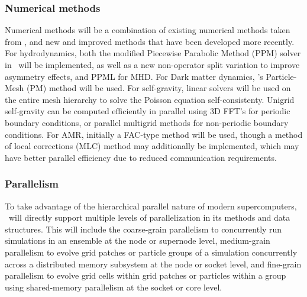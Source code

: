 \documentclass[11pt]{article}
\begin{document}
    \subsubsection{Numerical methods}

    Numerical methods will be a combination of existing numerical
    methods taken from \enzo, and new and improved methods that have
    been developed more recently.  For hydrodynamics, both the
    modified Piecewise Parabolic Method (PPM) solver in \enzo\ will be
    implemented, as well as a new non-operator split variation to
    improve asymmetry effects, and PPML for MHD.  For Dark matter
    dynamics, \enzo's Particle-Mesh (PM) method will be used.  For
    self-gravity, linear solvers will be used on the entire mesh
    hierarchy to solve the Poisson equation self-consistenty.  Unigrid
    self-gravity can be computed efficiently in parallel using 3D
    FFT's for periodic boundary conditions, or parallel multigrid
    methods for non-periodic boundary conditions.  For AMR, initially
    a FAC-type method will be used, though a method of local
    corrections (MLC) method may additionally be implemented, which
    may have better parallel efficiency due to reduced communication
    requirements.

    \subsubsection{Parallelism} 


    To take advantage of the hierarchical parallel nature of modern
    supercomputers, \cello\ will directly support multiple levels of
    parallelization in its methods and data structures.  This will
    include the coarse-grain parallelism to concurrently run
    simulations in an ensemble at the node or supernode level,
    medium-grain parallelism to evolve grid patches or particle groups
    of a simulation concurrently across a distributed memory subsystem
    at the node or socket level, and fine-grain parallelism to evolve
    grid cells within grid patches or particles within a group using
    shared-memory parallelism at the socket or core level.

\end{document}
